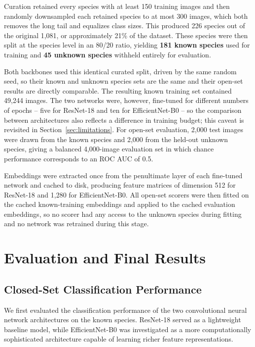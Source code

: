 \documentclass[11pt]{article}
\begin{document}
Curation retained every species with at least 150 training images and then randomly downsampled each retained species to at most 300 images, which both removes the long tail and equalizes class sizes. This produced 226 species out of the original 1,081, or approximately 21\% of the dataset. These species were then split at the species level in an 80/20 ratio, yielding \textbf{181 known species} used for training and \textbf{45 unknown species} withheld entirely for evaluation.

Both backbones used this identical curated split, driven by the same random seed, so their known and unknown species sets are the same and their open-set results are directly comparable. The resulting known training set contained 49,244 images. The two networks were, however, fine-tuned for different numbers of epochs -- five for ResNet-18 and ten for EfficientNet-B0 -- so the comparison between architectures also reflects a difference in training budget; this caveat is revisited in Section~\ref{sec:limitations}. For open-set evaluation, 2,000 test images were drawn from the known species and 2,000 from the held-out unknown species, giving a balanced 4,000-image evaluation set in which chance performance corresponds to an ROC AUC of 0.5.

Embeddings were extracted once from the penultimate layer of each fine-tuned network and cached to disk, producing feature matrices of dimension 512 for ResNet-18 and 1,280 for EfficientNet-B0. All open-set scorers were then fitted on the cached known-training embeddings and applied to the cached evaluation embeddings, so no scorer had any access to the unknown species during fitting and no network was retrained during this stage.

\section{Evaluation and Final Results}


\subsection{Closed-Set Classification Performance}

We first evaluated the classification performance of the two convolutional neural network architectures on the known species. ResNet-18 served as a lightweight baseline model, while EfficientNet-B0 was investigated as a more computationally sophisticated architecture capable of learning richer feature representations.
\end{document}
